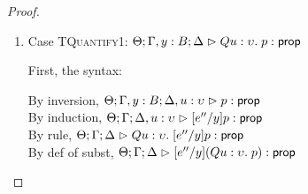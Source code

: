 \begin{proof}
\begin{enumerate}
  First, the syntax:
  \begin{tabbedproof}
    \oo By inversion, $\judgeA[\Theta; \Gamma, y:B; \Delta]{p}{\assert}$\\
    \oo By inversion, $\judgeA[\Theta; \Gamma, y:B; \Delta]{q}{\assert}$\\
    \oo By induction, $\judgeA[\Theta; \Gamma; \Delta]{[e''/y]p}{\assert}$\\
    \oo By induction, $\judgeA[\Theta; \Gamma; \Delta]{[e''/y]q}{\assert}$\\
    \oo By rule, $\judgeA[\Theta; \Gamma; \Delta]{[e''/y]p \oplus [e''/y]q}{\assert}$\\
    \oo By subst def, $\judgeA[\Theta; \Gamma; \Delta]{[e''/y](p \oplus q)}{\assert}$\\
  \end{tabbedproof}

  For semantics, consider $\interp{\judgeA[\Theta; \Gamma; \Delta]{[e''/y](p \oplus q)}{\assert}}\;\theta\;\gamma\;\delta$
  \begin{eqnproof}
    {Semantics}
    {Induction}
          {Semantics}
  \end{eqnproof}

\item Case \textsc{TQuantify1}: $\judgeA[\Theta; \Gamma, y:B; \Delta]{Q u:\upsilon.\;p}{\assert}$
  
  First, the syntax:
  \begin{tabbedproof}
    \oo By inversion, $\judgeA[\Theta; \Gamma, y:B; \Delta, u:\upsilon]{p}{\assert}$ \\
    \oo By induction, $\judgeA[\Theta; \Gamma; \Delta, u:\upsilon]{[e''/y]p}{\assert}$ \\
    \oo By rule, $\judgeA[\Theta; \Gamma; \Delta]
                         {Q u:\upsilon.\;[e''/y]p}{\assert}$ \\
    \oo By def of subst, $\judgeA[\Theta; \Gamma; \Delta]
                                 {[e''/y](Q u:\upsilon.\;p)}{\assert}$ 
  \end{tabbedproof}


\end{enumerate}
\end{proof}
